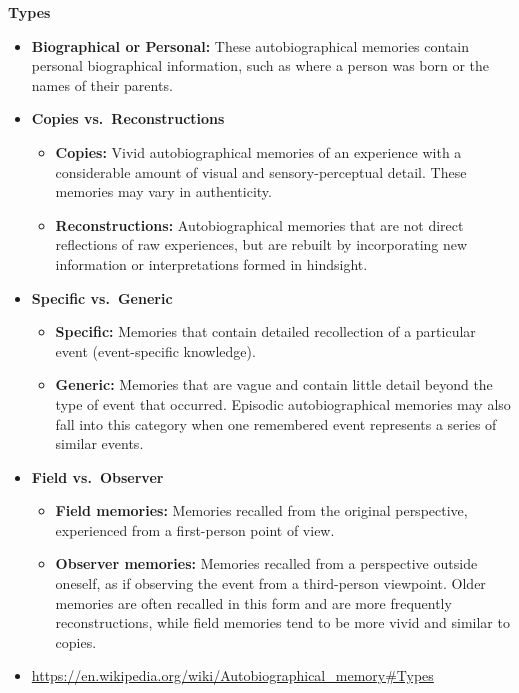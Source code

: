 \documentclass{book}
\providecommand{\ProjectDeepHeading}[2]{%
    \par\medskip\noindent\textbf{#2}\par\smallskip
}
\begin{document}
    
    \ProjectDeepHeading{15}{Types}
        \begin{itemize}
            \item \textbf{Biographical or Personal:}
            These autobiographical memories contain personal biographical information, such as where a person was born or the names of their parents.
            
            \item \textbf{Copies vs.\ Reconstructions}
            \begin{itemize}
                \item \textbf{Copies:} Vivid autobiographical memories of an experience with a considerable amount of visual and sensory-perceptual detail. These memories may vary in authenticity.
                \item \textbf{Reconstructions:} Autobiographical memories that are not direct reflections of raw experiences, but are rebuilt by incorporating new information or interpretations formed in hindsight.
            \end{itemize}
            
            \item \textbf{Specific vs.\ Generic}
            \begin{itemize}
                \item \textbf{Specific:} Memories that contain detailed recollection of a particular event (event-specific knowledge).
                \item \textbf{Generic:} Memories that are vague and contain little detail beyond the type of event that occurred. Episodic autobiographical memories may also fall into this category when one remembered event represents a series of similar events.
            \end{itemize}
            
            \item \textbf{Field vs.\ Observer}
            \begin{itemize}
                \item \textbf{Field memories:} Memories recalled from the original perspective, experienced from a first-person point of view.
                \item \textbf{Observer memories:} Memories recalled from a perspective outside oneself, as if observing the event from a third-person viewpoint. Older memories are often recalled in this form and are more frequently reconstructions, while field memories tend to be more vivid and similar to copies.
            \end{itemize}
            
            \item \url{https://en.wikipedia.org/wiki/Autobiographical_memory\#Types}
        \end{itemize}
\end{document}
